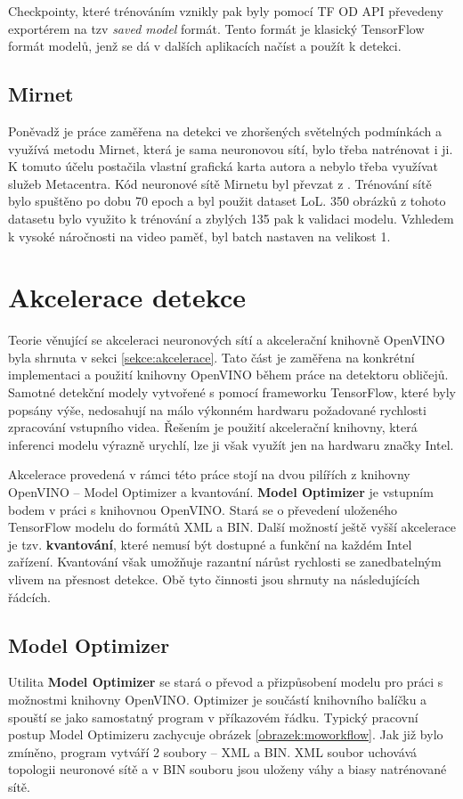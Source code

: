 Checkpointy, které trénováním vznikly pak byly pomocí TF OD API převedeny exportérem na tzv \emph{saved model} formát. Tento formát je klasický TensorFlow formát modelů, jenž se dá v dalších aplikacích načíst a použít k detekci.

\subsection*{Mirnet}
Poněvadž je práce zaměřena na detekci ve zhoršených světelných podmínkách a využívá metodu Mirnet, která je sama neuronovou sítí, bylo třeba natrénovat i ji. K tomuto účelu postačila vlastní grafická karta autora a nebylo třeba využívat služeb Metacentra. Kód neuronové sítě Mirnetu byl převzat z \cite{mirnet}. Trénování sítě bylo spuštěno po dobu 70 epoch a byl použit dataset LoL. 350 obrázků z tohoto datasetu bylo využito k trénování a zbylých 135 pak k validaci modelu. Vzhledem k vysoké náročnosti na video paměť, byl batch nastaven na velikost 1. 



\section{Akcelerace detekce}
\label{sekce:akcelerace_implementace}
Teorie věnující se akceleraci neuronových sítí a akcelerační knihovně OpenVINO byla shrnuta v sekci \ref{sekce:akcelerace}. Tato část je zaměřena na konkrétní implementaci a použití knihovny OpenVINO během práce na detektoru obličejů. Samotné detekční modely vytvořené s pomocí frameworku TensorFlow, které byly popsány výše, nedosahují na málo výkonném hardwaru požadované rychlosti zpracování vstupního videa. Řešením je použití akcelerační knihovny, která inferenci modelu výrazně urychlí, lze ji však využít jen na hardwaru značky Intel.

Akcelerace provedená v rámci této práce stojí na dvou pilířích z knihovny OpenVINO -- Model Optimizer a kvantování. \textbf{Model Optimizer} je vstupním bodem v práci s knihovnou OpenVINO. Stará se o převedení uloženého TensorFlow modelu do formátů XML a BIN. Další možností ještě vyšší akcelerace je tzv. \textbf{kvantování}, které nemusí být dostupné a funkční na každém Intel zařízení. Kvantování však umožňuje razantní nárůst rychlosti se zanedbatelným vlivem na přesnost detekce. Obě tyto činnosti jsou shrnuty na následujících řádcích.

\subsection*{Model Optimizer}
Utilita \textbf{Model Optimizer} \cite{modeloptimizer} se stará o převod a přizpůsobení modelu pro práci s možnostmi knihovny OpenVINO. Optimizer je součástí knihovního balíčku a spouští se jako samostatný program v příkazovém řádku. Typický pracovní postup Model Optimizeru zachycuje obrázek \ref{obrazek:moworkflow}. Jak již bylo zmíněno, program vytváří 2 soubory -- XML a BIN. XML soubor uchovává topologii neuronové sítě a v BIN souboru jsou uloženy váhy a biasy natrénované sítě.

